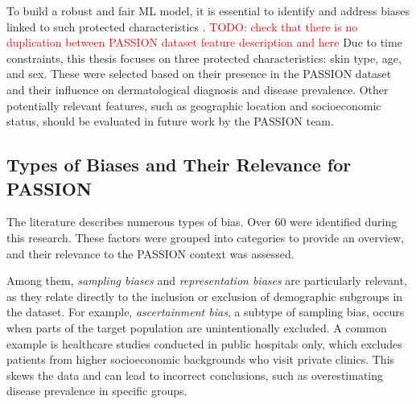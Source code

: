 \documentclass[12pt, a4paper, oneside]{book}   	%
\renewcommand{\todo}[1]{\textcolor{red}{TODO: #1}}
\begin{document}
			
			To build a robust and fair \gls{ML} model, it is essential to identify and address biases linked to such protected characteristics \autocite{Mehrabi2022}.
			\todo{check that there is no duplication between PASSION dataset feature description and here}
			Due to time constraints, this thesis focuses on three protected characteristics: skin type, age, and sex. These were selected based on their presence in the PASSION dataset and their influence on dermatological diagnosis and disease prevalence. Other potentially relevant features, such as geographic location and socioeconomic status, should be evaluated in future work by the PASSION team.
			
			

			
			\subsection{Types of Biases and Their Relevance for PASSION}
			The literature describes numerous types of bias. Over 60 were identified during this research. These factors were grouped into categories to provide an overview, and their relevance to the PASSION context was assessed.
			
			Among them, \textit{sampling biases} and \textit{representation biases} are particularly relevant, as they relate directly to the inclusion or exclusion of demographic subgroups in the dataset. For example, \textit{ascertainment bias}, a subtype of sampling bias, occurs when parts of the target population are unintentionally excluded. A common example is healthcare studies conducted in public hospitals only, which excludes patients from higher socioeconomic backgrounds who visit private clinics. This skews the data and can lead to incorrect conclusions, such as overestimating disease prevalence in specific groups.
			
\end{document}
